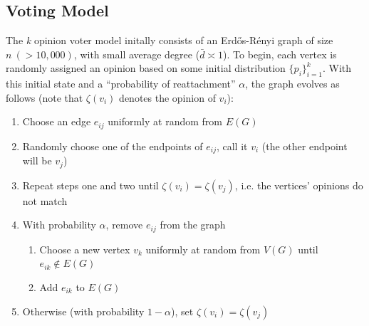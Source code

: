 \documentclass[11pt]{article}
\begin{document}
\subsection{Voting Model}
The \textit{k} opinion voter model initally consists of an Erd\H{o}s-R\'{e}nyi graph of size $n \ (>10,000)$, with small average degree ($\bar{d}\asymp 1$). To begin, each vertex is randomly assigned an opinion based on some initial distribution $\{p_{i}\}_{i=1}^{k}$. With this initial state and a ``probability of reattachment'' $\alpha$, the graph evolves as follows (note that $\zeta(v_{i})$ denotes the opinion of $v_{i}$):
\begin{enumerate}
\item Choose an edge $e_{ij}$ uniformly at random from $E(G)$
\item Randomly choose one of the endpoints of $e_{ij}$, call it $v_{i}$ (the other endpoint will be $v_{j}$)
\item Repeat steps one and two until $\zeta(v_{i}) = \zeta(v_{j})$, i.e. the vertices' opinions do not match
\item With probability $\alpha$, remove $e_{ij}$ from the graph
\begin{enumerate}
\item Choose a new vertex $v_{k}$ uniformly at random from $V(G)$ until $e_{ik} \notin E(G)$ 
\item Add $e_{ik}$ to $E(G)$
\end{enumerate}
\item Otherwise (with probability $1-\alpha$), set $\zeta(v_{i}) = \zeta(v_{j})$
\end{enumerate}
\end{document}
